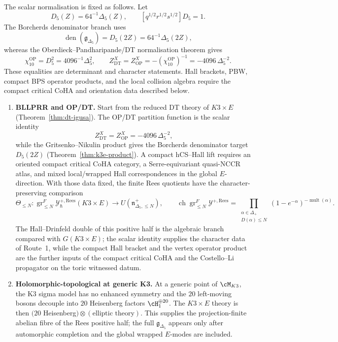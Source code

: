 The scalar normalisation is fixed as follows.  Let
\[
D_5(Z)=64^{-1}\Delta_5(Z),
\qquad
[q^{1/2}r^{1/2}s^{1/2}]D_5=1 .
\]
The Borcherds denominator branch uses
\[
\operatorname{den}(\mathfrak g_{\Delta_5})=D_5(2Z)
=64^{-1}\Delta_5(2Z),
\]
whereas the Oberdieck--Pandharipande/DT normalisation theorem gives
\[
\chi_{10}^{\mathrm{OP}}=D_5^2
=4096^{-1}\Delta_5^2,\qquad
Z^{X}_{\mathrm{DT}}=Z^{X}_{\mathrm{OP}}
=-(\chi_{10}^{\mathrm{OP}})^{-1}
=-4096\,\Delta_5^{-2}.
\]
These equalities are determinant and character statements.  Hall
brackets, PBW, compact BPS operator products, and the local collision
algebra require the compact critical CoHA and orientation data described
below.

\begin{enumerate}[label=\textbf{Route \arabic*.}, leftmargin=*]
 \item \textbf{BLLPRR and OP/DT.} Start from the reduced DT theory of
 $K3 \times E$ (Theorem~\ref{thm:dt-igusa}).  The OP/DT partition
 function is the scalar identity
 \[
 Z^{X}_{\mathrm{DT}}=Z^{X}_{\mathrm{OP}}
 =-4096\,\Delta_5^{-2},
 \]
 while the Gritsenko--Nikulin product gives the Borcherds denominator
 target \(D_5(2Z)\) (Theorem~\ref{thm:k3e-product}).  A compact
 hCS--Hall lift requires an oriented compact critical CoHA category, a
 Serre-equivariant quasi-NCCR atlas, and mixed local/wrapped Hall
 correspondences in the global \(E\)-direction.  With those data fixed,
 the finite Rees quotients have the character-preserving comparison
 \[
 \Theta_{\leq N}\colon
 \operatorname{gr}^{F}_{\leq N}
 \mathcal Y^{+,\mathrm{Rees}}_{\hbar}(K3\times E)
 \longrightarrow
 U(\mathfrak n^{+}_{\Delta_5,\leq N}),\qquad
 \operatorname{ch}\operatorname{gr}^{F}_{\leq N}\mathcal Y^{+,\mathrm{Rees}}
 =
 \prod_{\substack{\alpha\in\Delta_+\\ D(\alpha)\leq N}}
 (1-e^{-\alpha})^{-\operatorname{mult}(\alpha)} .
 \]
 The Hall--Drinfeld double of this positive half is the algebraic
 branch compared with \(G(K3\times E)\); the scalar identity supplies
 the character data of Route~1, while the compact Hall bracket and the
 vertex operator product are the further inputs of the compact
 critical CoHA and the Costello--Li propagator on the toric witnessed
 datum.

 \item \textbf{Holomorphic-topological at generic K3.} At a generic
 point of $\cM_{K3}$, the K3 sigma model has no enhanced symmetry and the
 $20$ left-moving bosons decouple into $20$ Heisenberg factors
 $\cH_1^{\oplus 20}$. The $K3 \times E$ theory is then
 $(20$ Heisenberg$) \otimes (\text{elliptic theory})$.  This supplies the
 projection-finite abelian fibre of the Rees positive half; the full
 \(\mathfrak g_{\Delta_5}\) appears only after automorphic completion and
 the global wrapped \(E\)-modes are included.


\end{enumerate}
